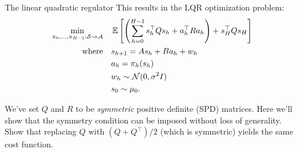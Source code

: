 \documentclass[\main/main]{subfiles}
\begin{document}
\begin{definition}{The linear quadratic regulator}
    \noindent This results in the LQR optimization problem:
    \begin{align*}
        \min_{\pi_0, \dots, \pi_{H-1} : \mathcal{S} \to \mathcal{A}} \quad & \operatorname*{\mathbb{E}} \left[ \left( \sum_{h=0}^{H-1} s_h^\top Q s_h + a_h^\top R a_h \right) + s_H^\top Q s_H \right] \\
        \textrm{where} \quad                                & s_{h+1} = A s_h + B a_h + w_h                                                                                        \\
                                                            & a_h = \pi_h (s_h)                                                                                                        \\
                                                            & w_h \sim \mathcal{N}(0, \sigma^2 I)                                                                                               \\
                                                            & s_0 \sim \mu_0.
    \end{align*}
\end{definition}

\begin{exercise}
    We've set $Q$ and $R$ to be \emph{symmetric} positive definite (SPD) matrices. Here we'll show that the symmetry condition can be imposed without loss of generality. Show that replacing $Q$ with $(Q + Q^\top) / 2$ (which is symmetric) yields the same cost function.
\end{exercise}
\end{document}
